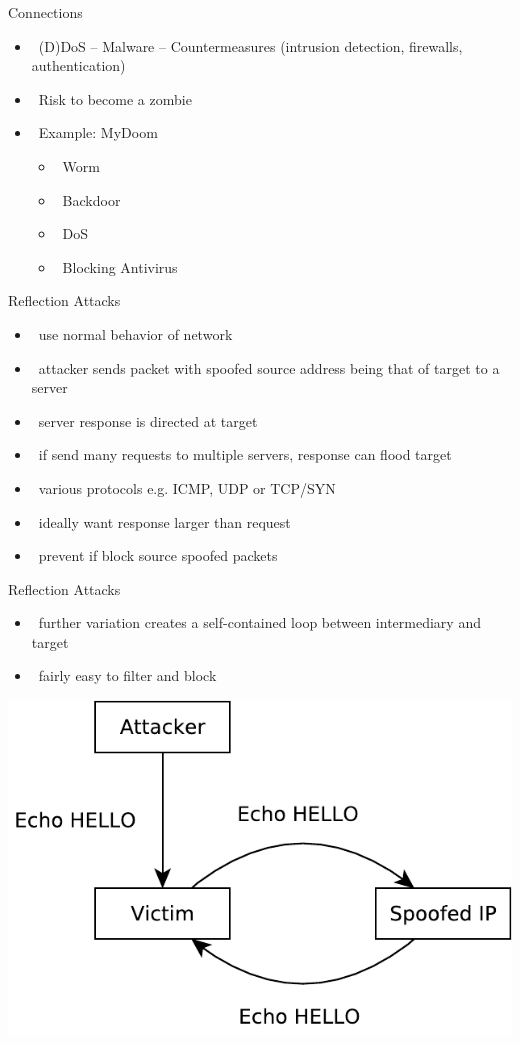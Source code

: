 \documentclass{beamer}
\begin{document}
\begin{frame}{Connections}
  \begin{itemize}
  \item  (D)DoS – Malware – Countermeasures 
    (intrusion detection, firewalls, authentication) 
  \item  Risk to become a zombie 
  \item  Example: MyDoom 
    \begin{itemize}
    \item  Worm 
    \item  Backdoor 
    \item  DoS 
    \item  Blocking Antivirus
    \end{itemize}
  \end{itemize}
\end{frame}


\begin{frame}{Reflection Attacks}
  \begin{itemize}
  \item  use normal behavior of network 
  \item  attacker sends packet with spoofed source 
    address being that of target to a server 
  \item  server response is directed at target 
  \item  if send many requests to multiple servers, 
    response can flood target 
  \item  various protocols e.g. ICMP, UDP or TCP/SYN 
  \item  ideally want response larger than request 
  \item  prevent if block source spoofed packets
  \end{itemize}
\end{frame}



\begin{frame}{Reflection Attacks }
  \begin{itemize}
  \item  further variation creates a self-contained loop 
    between intermediary and target 
  \item  fairly easy to filter and block
  \end{itemize}
  \begin{center}
  \includegraphics[width=0.6\linewidth]{reflection}
  \end{center}
\end{frame}
\end{document}
